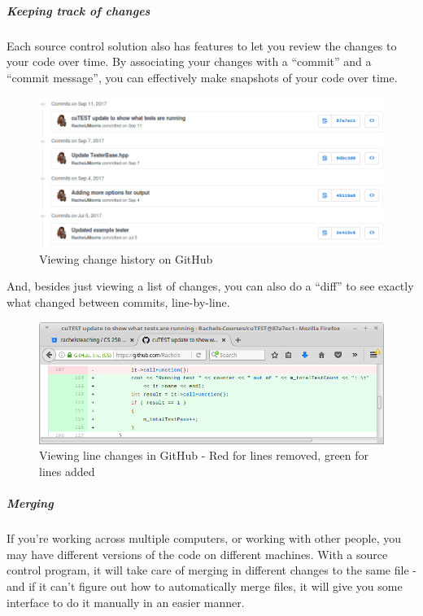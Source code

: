 \documentclass[a4paper,12pt,oneside]{book}
\begin{document}
        \newpage

        \subparagraph{Keeping track of changes}
            Each source control solution also has features to let you
            review the changes to your code over time. By associating
            your changes with a ``commit'' and a ``commit message'',
            you can effectively make snapshots of your code over time.

            \begin{figure}[h]
                \centering
                \includegraphics[width=14cm]{images/github-history.png}
                \caption{Viewing change history on GitHub}
            \end{figure}

            And, besides just viewing a list of changes, you can also
            do a ``diff'' to see exactly what changed between commits,
            line-by-line.

            \begin{figure}[h]
                \centering
                \includegraphics[width=14cm]{images/git-diff.png}
                \caption{Viewing line changes in GitHub - Red for lines removed, green for lines added}
            \end{figure}

        \subparagraph{Merging}
            If you're working across multiple computers, or working with other people,
            you may have different versions of the code on different machines.
            With a source control program, it will take care of merging
            in different changes to the same file - and if it can't figure out
            how to automatically merge files, it will give you some interface
            to do it manually in an easier manner.
\end{document}
